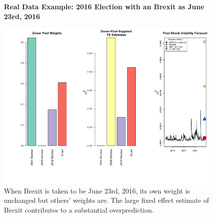 \documentclass[11pt,3p,review,authoryear]{elsarticle}
\theoremstyle{definition}
\begin{document}
  \begin{figure}[H]
    \begin{center}
      \textbf{Real Data Example: 2016 Election with an Brexit as June 23rd, 2016}\par\medskip
      \includegraphics[scale=.6]{real_data_output_plots/WedJun121222522024_IYG_None_None.png}
      \caption{When Brexit is taken to be June 23rd, 2016, its own weight is unchanged but others' weights are.  The large fixed effect estimate of Brexit contributes to a substantial overprediction.}
      \label{fig:SVF_2016_with_Brexit}
      \end{center}
    \end{figure}
  
\clearpage


\end{document}
